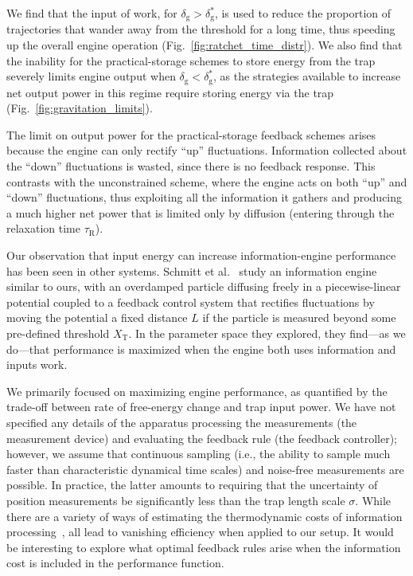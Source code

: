 \documentclass[%
reprint,
bibnotes, amsmath, amssymb, aps, pre,
 showkeys,
floatfix
]{revtex4-2}
\newcommand{\mrm}{\mathrm}
\newcommand{\dg}{\delta_{\mrm{g}}}
\newcommand{\xT}{X_{\mrm{T}}}
\begin{document}
We find that the input of work, for $\dg > \dg^{*}$, is used to reduce the proportion of trajectories that wander away from the threshold for a long time, thus speeding up the overall engine operation (Fig.~\ref{fig:ratchet_time_distr}).
We also find that the inability for the practical-storage schemes to store energy from the trap severely limits engine output when $\dg < \dg^{*}$, as the strategies available to increase net output power in this regime require storing energy via the trap (Fig.~\ref{fig:gravitation_limits}).

The limit on output power for the practical-storage feedback schemes arises because the engine can only rectify ``up'' fluctuations.
Information collected about the ``down'' fluctuations is wasted, since there is no feedback response.
This contrasts with the unconstrained scheme, where the engine acts on both ``up'' and ``down'' fluctuations, thus exploiting all the information it gathers and producing a much higher net power that is limited only by diffusion (entering through the relaxation time $\tau_\textrm{R}$).

Our observation that input energy can increase information-engine performance has been seen in other systems. 
Schmitt et al.~\cite{schmitt2015} study an information engine similar to ours, with an overdamped particle diffusing freely in a piecewise-linear potential coupled to a feedback control system that rectifies fluctuations by moving the potential a fixed distance $L$ if the particle is measured beyond some pre-defined threshold $\xT$. In the parameter space they explored, they find---as we do---that performance is maximized when the engine both uses information and inputs work.

We primarily focused on maximizing engine performance, as quantified by the trade-off between rate of free-energy change and trap input power.
We have not specified any details of the apparatus processing the measurements (the measurement device) and evaluating the feedback rule (the feedback controller); however, we assume that continuous sampling (i.e., the ability to sample much faster than characteristic dynamical time scales) and noise-free measurements are possible.
In practice, the latter amounts to requiring that the uncertainty of position measurements be significantly less than the trap length scale $\sigma$.
While there are a variety of ways of estimating the thermodynamic costs of information processing~\cite{Horowitz2014}, all lead to vanishing efficiency when applied to our setup.
It would be interesting to explore what optimal feedback rules arise when the information cost is included in the performance function.
\end{document}
